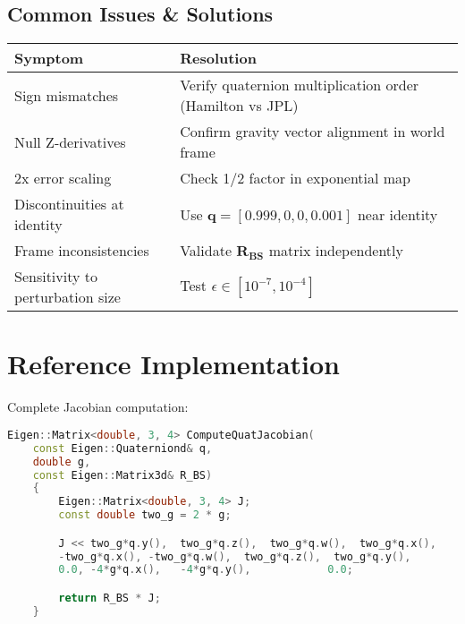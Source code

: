 \documentclass{article}
\begin{document}
\subsection{Common Issues \& Solutions}
\begin{tabular}{p{4.5cm}p{8cm}}
	\textbf{Symptom} & \textbf{Resolution} \\
	\midrule
	Sign mismatches & Verify quaternion multiplication order (Hamilton vs JPL) \\
	Null Z-derivatives & Confirm gravity vector alignment in world frame \\
	2x error scaling & Check 1/2 factor in exponential map \\
	Discontinuities at identity & Use $\mathbf{q}=[0.999,0,0,0.001]$ near identity \\
	Frame inconsistencies & Validate $\mathbf{R_{BS}}$ matrix independently \\
	Sensitivity to perturbation size & Test $\epsilon\in[10^{-7},10^{-4}]$ \\
\end{tabular}

\appendix
\section{Reference Implementation}
\label{app:code}

Complete Jacobian computation:
\begin{lstlisting}[language=C++,basicstyle=\color{codeblue}\ttfamily]
	Eigen::Matrix<double, 3, 4> ComputeQuatJacobian(
	const Eigen::Quaterniond& q,
	double g,
	const Eigen::Matrix3d& R_BS)
	{
		Eigen::Matrix<double, 3, 4> J;
		const double two_g = 2 * g;

		J << two_g*q.y(),  two_g*q.z(),  two_g*q.w(),  two_g*q.x(),
		-two_g*q.x(), -two_g*q.w(),  two_g*q.z(),  two_g*q.y(),
		0.0, -4*g*q.x(),   -4*g*q.y(),            0.0;

		return R_BS * J;
	}
\end{lstlisting}


	
\end{document}

